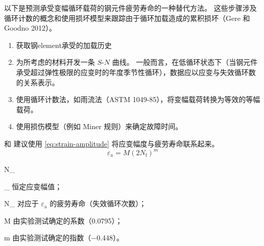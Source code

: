 以下是预测承受变幅循环载荷的钢元件疲劳寿命的一种替代方法。 这些步骤涉及循环计数的概念和使用损坏模型来跟踪由于循环加载造成的累积损坏（Gere 和 Goodno 2012）。
\begin{enumerate}
  \item 获取钢\gls*{element}承受的加载历史
  \item 为所考虑的材料开发一条 $S$-$N$ 曲线。 一般而言，在低循环状态下（当钢元件承受超过弹性极限的应变时的年度季节性循环），数据应以应变与失效循环数的关系表示。
  \item 使用循环计数法，如雨流法（ASTM 1049-85），将变幅载荷转换为等效的等幅载荷。
  \item 使用损伤模型（例如 Miner 规则）来确定故障时间。
\end{enumerate}

 和   建议使用 \cref{eq:strain-amplitude} 将应变幅度与疲劳寿命联系起来。
\begin{equation}
  \label{eq:strain-amplitude}
  \varepsilon_\text{a} = M \left( 2N_\text{f} \right)^m 
\end{equation}
\begin{EqDesc}{N_}
  \item[\varepsilon_\text{a}] 恒定应变幅值；
  \item[N_\text{f}] 对应于 $\varepsilon_\text{a}$ 的疲劳寿命（失效循环次数）；
  \item[M] 由实验测试确定的系数（0.0795）；
  \item[m] 由实验测试确定的指数（\num{-0.448}）。
\end{EqDesc}


